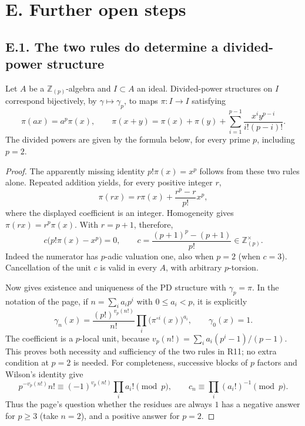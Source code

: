 \section{E. Further open steps}
\subsection{E.1. The two rules do determine a divided-power structure}

\begin{theorem}\label{thm:DE-PD-pi}
Let $A$ be a $\mathbb Z_{(p)}$-algebra and $I\subset A$ an ideal.  Divided-power structures on $I$ correspond bijectively, by $\gamma\mapsto\gamma_p$, to maps $\pi:I\to I$ satisfying
\[
 \pi(ax)=a^p\pi(x),\qquad
 \pi(x+y)=\pi(x)+\pi(y)+\sum_{i=1}^{p-1}\frac{x^iy^{p-i}}{i!(p-i)!}.
\]
The divided powers are given by the formula below, for every prime $p$, including $p=2$.
\end{theorem}
\begin{proof}
The apparently missing identity $p!\pi(x)=x^p$ follows from these two rules alone.  Repeated addition yields, for every positive integer $r$,
\[
 \pi(rx)=r\pi(x)+\frac{r^p-r}{p!}x^p,
\]
where the displayed coefficient is an integer.  Homogeneity gives $\pi(rx)=r^p\pi(x)$.  With $r=p+1$, therefore,
\[
 c\bigl(p!\pi(x)-x^p\bigr)=0,\qquad
 c=\frac{(p+1)^p-(p+1)}{p!}\in\mathbb Z_{(p)}^\times.
\]
Indeed the numerator has $p$-adic valuation one, also when $p=2$ (when $c=3$).  Cancellation of the unit $c$ is valid in every $A$, with arbitrary $p$-torsion.

Now \cite[Lemma~23.5.3, Tag~07GS]{StacksProject} gives existence and uniqueness of the PD structure with $\gamma_p=\pi$.  In the notation of the page, if $n=\sum_i a_ip^i$ with $0\leq a_i<p$, it is explicitly
\[
 \gamma_n(x)=\frac{(p!)^{v_p(n!)}}{n!}\prod_i\bigl(\pi^{\circ i}(x)\bigr)^{a_i},\qquad
 \gamma_0(x)=1.
\]
The coefficient is a $p$-local unit, because $v_p(n!)=\sum_i a_i(p^i-1)/(p-1)$.  This proves both necessity and sufficiency of the two rules in R11; no extra condition at $p=2$ is needed.  For completeness, successive blocks of $p$ factors and Wilson's identity give
\[
 p^{-v_p(n!)}n!\equiv(-1)^{v_p(n!)}\prod_i a_i!\pmod p,
 \qquad c_n\equiv\prod_i(a_i!)^{-1}\pmod p.
\]
Thus the page's question whether the residues are always $1$ has a negative answer for $p\geq3$ (take $n=2$), and a positive answer for $p=2$.
\end{proof}

